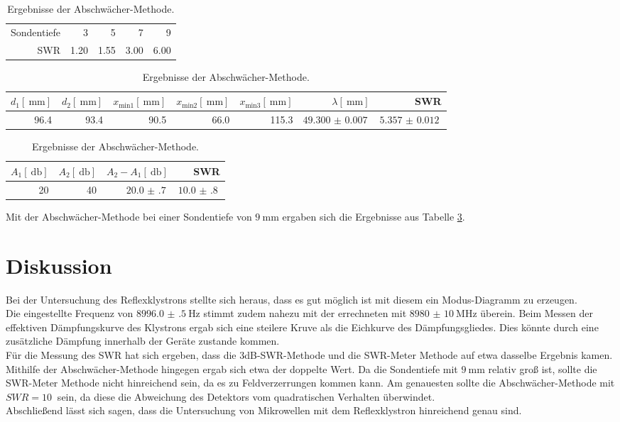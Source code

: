 \begin{table}
	\centering
	\begin{tabular}{r || r r r r|}
	 Sondentiefe &    3 &    5 &    7 &    9\\
	        SWR & 1.20 & 1.55 & 3.00 & 6.00\\
	\end{tabular}
	\caption{Ergebnisse der SWR-Meter Methode.}
	\label{v3:1}
	\begin{tabular}{r r r r r r r}
	$d_\text{1}[\SI{}{\milli\meter}]$ & $d_\text{2}[\SI{}{\milli\meter}]$ & $x_\text{min1}[\SI{}{\milli\meter}]$ & $x_\text{min2}[\SI{}{\milli\meter}]$ & $x_\text{min3}[\SI{}{\milli\meter}]$ & $\lambda[\SI{}{\milli\meter}]$ & SWR\\
	\hline
	\hline
	96.4 & 93.4 & 90.5 & 66.0 & 115.3 & $\SI{49.300(7)}{}$ & $\SI{5.357(12)}{}$\\
	\end{tabular}
	\caption{Ergebnisse der 3dB-SWR-Methode.}
	\label{v3:2}
	\begin{tabular}{r r r r}
	$A_\text{1}[\SI{}{\decibel}]$ & $A_\text{2}[\SI{}{\decibel}]$ & $A_\text{2}-A_\text{1}[\SI{}{\decibel}]$ & SWR\\
	\hline
	\hline
	20 & 40 & $\SI{20.0(7)}{}$ & $\SI{10.0(8)}{}$\\
	\end{tabular}
	\caption{Ergebnisse der Abschwächer-Methode.}
	\label{v3:3}
\end{table}

Mit der Abschwächer-Methode bei einer Sondentiefe von $\SI{9}{\milli\meter}$ ergaben sich die Ergebnisse aus Tabelle \ref{v3:3}.\\


\section{Diskussion} %
\label{sec:diskussion}

Bei der Untersuchung des Reflexklystrons stellte sich heraus, dass es gut möglich ist mit diesem ein Modus-Diagramm zu erzeugen.\\

Die eingestellte Frequenz von $\SI{8996.0(5)}{\hertz}$ stimmt zudem nahezu mit der errechneten mit $\SI{8980(10)}{\mega\hertz}$ überein.
Beim Messen der effektiven Dämpfungskurve des Klystrons ergab sich eine steilere Kruve als die Eichkurve des Dämpfungsgliedes.
Dies könnte durch eine zusätzliche Dämpfung innerhalb der Geräte zustande kommen.\\

Für die Messung des SWR hat sich ergeben, dass die 3dB-SWR-Methode und die SWR-Meter Methode auf etwa dasselbe Ergebnis kamen.
Mithilfe der Abschwächer-Methode hingegen ergab sich etwa der doppelte Wert.
Da die Sondentiefe mit $\SI{9}{\milli\meter}$ relativ groß ist, sollte die SWR-Meter Methode nicht hinreichend sein, da es zu Feldverzerrungen kommen kann.
Am genauesten sollte die Abschwächer-Methode mit $SWR = \SI{10}{}$ sein, da diese die Abweichung des Detektors vom quadratischen Verhalten überwindet.\\

Abschließend lässt sich sagen, dass die Untersuchung von Mikrowellen mit dem Reflexklystron hinreichend genau sind.

